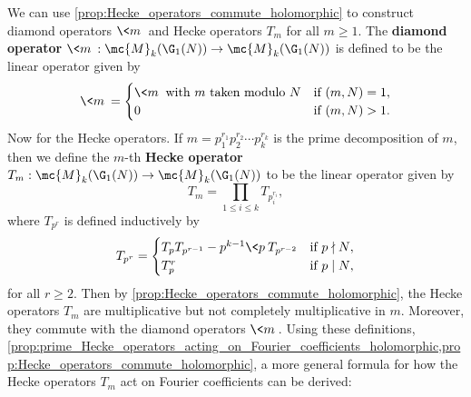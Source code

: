     We can use \cref{prop:Hecke_operators_commute_holomorphic} to construct diamond operators $\<m\>$ and Hecke operators $T_{m}$ for all $m \ge 1$. The \textbf{diamond operator} $\<m\>:\mc{M}_{k}(\G_{1}(N)) \to \mc{M}_{k}(\G_{1}(N))$ is defined to be the linear operator given by
    \[
      \<m\> = \begin{cases} \<m\> \text{ with $m$ taken modulo $N$} & \text{if $(m,N) = 1$}, \\ 0 & \text{if $(m,N) > 1$}. \end{cases}
    \]
    Now for the Hecke operators. If $m = p_{1}^{r_{1}}p_{2}^{r_{2}} \cdots p_{k}^{r_{k}}$ is the prime decomposition of $m$, then we define the $m$-th \textbf{Hecke operator} $T_{m}:\mc{M}_{k}(\G_{1}(N)) \to \mc{M}_{k}(\G_{1}(N))$ to be the linear operator given by
    \[
      T_{m} = \prod_{1 \le i \le k}T_{p_{i}^{r_{i}}},
    \]
    where $T_{p^{r}}$ is defined inductively by
    \[
      T_{p^{r}} = \begin{cases} T_{p}T_{p^{r-1}}-p^{k-1}\<p\>T_{p^{r-2}} & \text{if $p \nmid N$}, \\ T_{p}^{r} & \text{if $p \mid N$}, \end{cases}
    \]
    for all $r \ge 2$. Then by \cref{prop:Hecke_operators_commute_holomorphic}, the Hecke operators $T_{m}$ are multiplicative but not completely multiplicative in $m$. Moreover, they commute with the diamond operators $\<m\>$. Using these definitions, \cref{prop:prime_Hecke_operators_acting_on_Fourier_coefficients_holomorphic,prop:Hecke_operators_commute_holomorphic}, a more general formula for how the Hecke operators $T_{m}$ act on Fourier coefficients can be derived:

